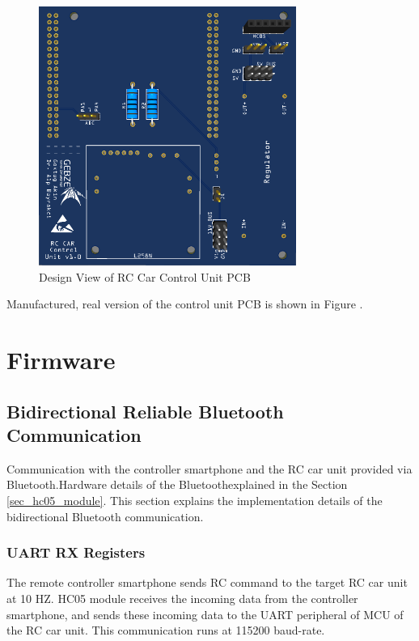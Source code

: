 \begin{figure}[!htbp]
    \centering
    \includegraphics[width=0.75\textwidth]{Imgs/pcb.png}
    \caption{\label{fig:custom_pcb}Design View of RC Car Control Unit PCB}
\end{figure}

Manufactured, real version of the control unit PCB is shown in Figure .


\section{Firmware} \label{sec_firmware_design}

\subsection{Bidirectional Reliable Bluetooth Communication} \label{sec_bluetooth_comm}

Communication with the controller smartphone and the RC car unit provided via Bluetooth\texttrademark.\;Hardware details of the Bluetooth\texttrademark\;explained in the Section \ref{sec_hc05_module}. This section explains the implementation details of the bidirectional Bluetooth\texttrademark\; communication.

\subsubsection{UART RX Registers} \label{sec_receive_rc_command}

The remote controller smartphone sends RC command to the target RC car unit at 10 HZ. HC05 module receives the incoming data from the controller smartphone, and sends these incoming data to the UART peripheral of MCU of the RC car unit. This communication runs at 115200 baud-rate. \\

